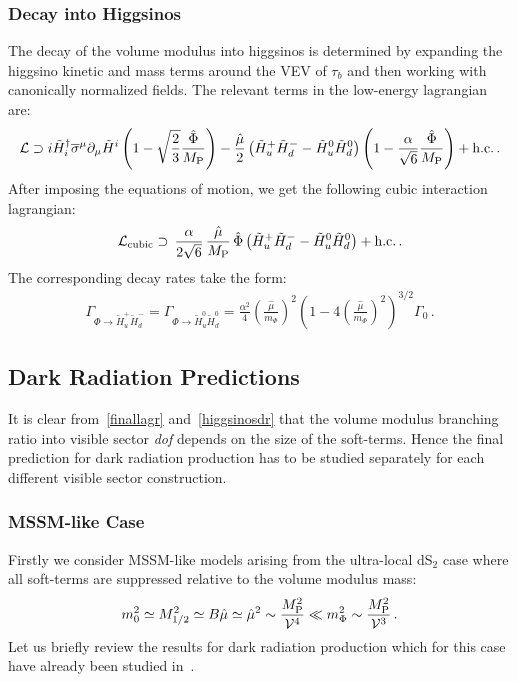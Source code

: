 \documentclass[12pt,a4paper]{book}
\newcommand\vo{{\mathcal{V}}}
\newcommand{\mc}{\mathcal}
\newcommand{\V}{{\cal{V}}}
\begin{document}
\subsubsection*{Decay into Higgsinos}

The decay of the volume modulus into higgsinos is determined by expanding the higgsino kinetic and mass terms around the VEV of $\tau_b$ and then working with canonically normalized fields. The relevant terms in the low-energy lagrangian are:
\begin{align}
\mc{L} \supset i \tilde{H}^{\dagger}_i \overline{\sigma}^\mu \partial_\mu \tilde{H}^{i} \left(1-\sqrt{\frac 23}\frac{\hat\Phi}{M_{\rm P}}\right)- \frac{\hat\mu}{2} \left(\tilde{H}_u^+ \tilde{H}_d^- - \tilde{H}_u^0 \tilde{H}_d^0\right)\left(1-\frac{\alpha}{\sqrt{6}} \frac{\hat\Phi}{M_{\rm P}}\right) +\text{h.c.} \,.
\end{align}
After imposing the equations of motion, we get the following cubic interaction lagrangian:
\begin{align}
\mc{L}_{\rm cubic} \supset \, \frac{\alpha}{2 \sqrt{6}} \, \frac{\hat\mu}{M_{\rm P}} \,\hat\Phi \left(\tilde{H}_u^+ \tilde{H}_d^- - \tilde{H}_u^0 \tilde{H}_d^0\right)+\text{h.c.}\,.
\label{higgsinocubic}
\end{align}
The corresponding decay rates take the form:
\begin{align}
\Gamma_{\Phi \rightarrow \tilde{H}_u^+ \tilde{H}_d^-} = \Gamma_{\Phi \rightarrow \tilde{H}_u^0 \tilde{H}_d^0} = \frac{\alpha^2}{4} \left(\frac{\hat\mu}{m_\Phi}\right)^2 \left(1 - 4 \left(\frac{\hat\mu}{m_\Phi}\right)^2\right)^{3/2} \Gamma_0 \,.
\label{higgsinosdr}
\end{align}

\subsection{Dark Radiation Predictions}

It is clear from~\eqref{finallagr} and~\eqref{higgsinosdr} that the volume modulus branching ratio into visible sector \textit{dof} depends on the size of the soft-terms. Hence the final prediction for dark radiation production has to be studied separately for each different visible sector construction. 

\subsubsection{MSSM-like Case}

Firstly we consider MSSM-like models arising from the ultra-local dS$_2$ case where all soft-terms are suppressed relative to the volume modulus mass:
\begin{align}
m_0^2 \simeq M_{1/2}^2 \simeq B\hat{\mu} \simeq \hat{\mu}^2 \sim \frac{M_{\rm P}^2}{\vo^4} \ll m_{\Phi}^2 \sim \frac{M_{\rm P}^2}{\V^3}\,.
\end{align}
Let us briefly review the results for dark radiation production which for this case have already been studied in~\cite{Cicoli:2012aq, Higaki:2012ar}. 
\end{document}
